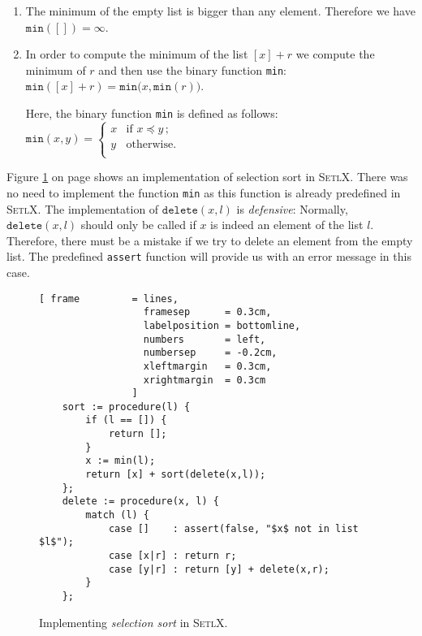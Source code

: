 \begin{enumerate}
\item The minimum of the empty list is bigger than any element.  Therefore we have 
      \\[0.2cm]
      \hspace*{1.3cm} $\mathtt{min}([]) = \infty$.
\item In order to compute the minimum of the list $[x] + r$ we compute the minimum of $r$ and
      then use the binary function \texttt{min}: \\[0.2cm]
      \hspace*{1.3cm} 
      $\mathtt{min}([x] + r) = \mathtt{min}\bigl(x, \mathtt{min}(r) \bigr)$. 

      Here, the binary function \texttt{min} is defined as follows: \\[0.2cm]
      \hspace*{1.3cm} 
      $\mathtt{min}(x,y) = \left\{
      \begin{array}{ll}
        x  & \mbox{if $x \preceq y\,$;} \\
        y  & \mbox{otherwise.} \\
      \end{array}\right.
      $
\end{enumerate}
Figure \ref{fig:selection-sort.setlx} on page \pageref{fig:selection-sort.setlx} shows an
implementation of selection sort in \textsc{SetlX}.  There was no need to implement the function \texttt{min} as this function is already predefined in \textsc{SetlX}.
The implementation of $\mathtt{delete}(x,l)$ is \emph{defensive}:  Normally, $\mathtt{delete}(x, l)$
should only be called if $x$ is indeed an element of the list $l$.   Therefore, there must be
a mistake if we try to delete an element from the empty list.  The predefined \texttt{assert}
function will provide us with an error message in this case.


\begin{figure}[!ht]
  \centering
\begin{Verbatim}[ frame         = lines, 
                  framesep      = 0.3cm, 
                  labelposition = bottomline,
                  numbers       = left,
                  numbersep     = -0.2cm,
                  xleftmargin   = 0.3cm,
                  xrightmargin  = 0.3cm
                ]
    sort := procedure(l) {
        if (l == []) {
            return [];
        }
        x := min(l);
        return [x] + sort(delete(x,l));
    };   
    delete := procedure(x, l) {
        match (l) {
            case []    : assert(false, "$x$ not in list $l$");
            case [x|r] : return r;
            case [y|r] : return [y] + delete(x,r);
        }
    };
\end{Verbatim}
\vspace*{-0.3cm}
  \caption{Implementing \emph{selection sort} in \textsc{SetlX}.}
  \label{fig:selection-sort.setlx}
\end{figure}

